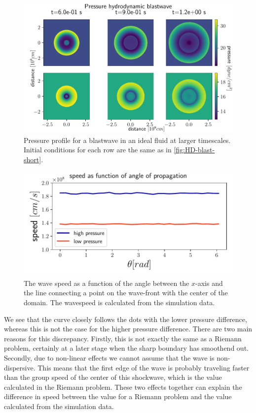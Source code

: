 \begin{figure}[H]
	\centering
	\includegraphics[width=\linewidth]{images/HD-blast-prs-2.pdf}
	\caption{Pressure profile for a blastwave in an ideal fluid at larger timescales. Initial conditions for each row are the same as in \autoref{fig:HD-blast-short}.}
	\label{fig:HD-blast-long}
\end{figure}

\begin{figure}[h]
	\centering
	\includegraphics[width=\linewidth]{images/speed-angle-hd.pdf}
	\caption{The wave speed as a function of the angle between the $x$-axis and the line connecting a point on the wave-front with the center of the domain. The wavespeed is calculated from the simulation data.}
	\label{fig:speed-angle-hd}
\end{figure}

We see that the curve closely follows the dots with the lower pressure difference, whereas this is not the case for the higher pressure difference.
There are two main reasons for this discrepancy. 
Firstly, this is not exactly the same as a Riemann problem, certainly at a later stage when the sharp boundary has smoothend out.
Secondly, due to non-linear effects we cannot assume that the wave is non-dispersive. 
This means that the first edge of the wave is probably traveling faster than the group speed of the center of this shockwave, which is the value calculated in the Riemann problem.
These two effects together can explain the difference in speed between the value for a Riemann problem and the value calculated from the simulation data.

